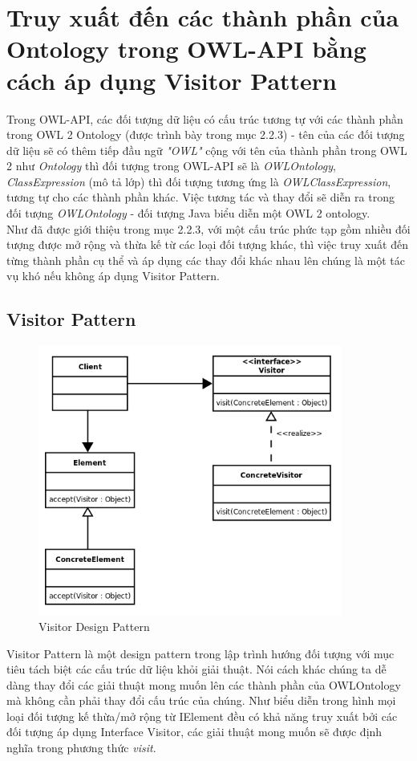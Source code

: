 \section{Truy xuất đến các thành phần của Ontology trong OWL-API bằng cách áp dụng Visitor Pattern}
Trong OWL-API, các đối tượng dữ liệu có cấu trúc tương tự với các thành phần trong OWL 2 Ontology (được trình bày trong mục 2.2.3) - tên của các đối tượng dữ liệu sẽ có thêm tiếp đầu ngữ \textit{"OWL"} cộng với tên của thành phần trong OWL 2 như \textit{Ontology} thì đối tượng trong OWL-API sẽ là \textit{OWLOntology}, \textit{ClassExpression} (mô tả lớp) thì đối tượng tương ứng là \textit{OWLClassExpression}, tương tự cho các thành phần khác. Việc tương tác và thay đổi sẽ diễn ra trong đối tượng \textit{OWLOntology} - đối tượng Java biểu diễn một OWL 2 ontology. 
\\
Như đã được giới thiệu trong mục 2.2.3, với một cấu trúc phức tạp gồm nhiều đối tượng được mở rộng và thừa kế từ các loại đối tượng khác, thì việc truy xuất đến từng thành phần cụ thể và áp dụng các thay đổi khác nhau lên chúng là một tác vụ khó nếu không áp dụng Visitor Pattern.
\subsection{Visitor Pattern}
\begin{figure}[h!]
	\centering
	\includegraphics[width=100mm]{Figures/visitor_diagram.png}
	\caption{Visitor Design Pattern\label{overflow}}
\end{figure}
Visitor Pattern là một design pattern trong lập trình hướng đối tượng với mục tiêu tách biệt các cấu trúc dữ liệu khỏi giải thuật. Nói cách khác chúng ta dễ dàng thay đổi các giải thuật mong muốn lên các thành phần của OWLOntology mà không cần phải thay đổi cấu trúc của chúng. Như biểu diễn trong hình mọi loại đối tượng kế thừa/mở rộng từ IElement đều có khả năng truy xuất bởi các đối tượng áp dụng Interface Visitor, các giải thuật mong muốn sẽ được định nghĩa trong phương thức \textit{visit}.
